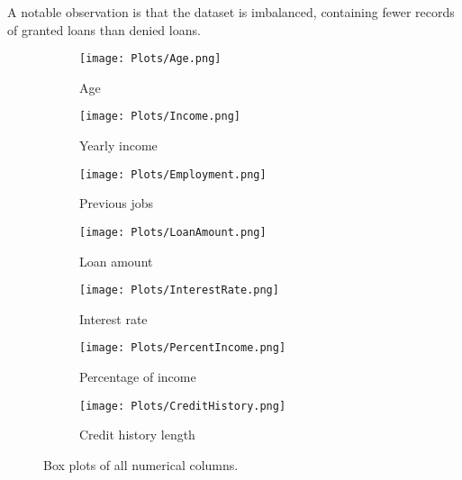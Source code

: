 A notable observation is that the dataset is imbalanced, containing fewer records of granted 
loans than denied loans.

\begin{figure}[H]
    \centering
    \begin{subfigure}[b]{0.22\textwidth}
        \centering
        \texttt{[image: Plots/Age.png]}
        \caption{Age}
        \label{fig:Boxplot1}
    \end{subfigure}
    \hfill
    \begin{subfigure}[b]{0.22\textwidth}
        \centering
        \texttt{[image: Plots/Income.png]}
        \caption{Yearly income}
        \label{fig:Boxplot2}
    \end{subfigure}
    \hfill
    \begin{subfigure}[b]{0.22\textwidth}
        \centering
        \texttt{[image: Plots/Employment.png]}
        \caption{Previous jobs}
        \label{fig:Boxplot3}
    \end{subfigure}
    \hfill
    \begin{subfigure}[b]{0.22\textwidth}
        \centering
        \texttt{[image: Plots/LoanAmount.png]}
        \caption{Loan amount}
        \label{fig:Boxplot4}
    \end{subfigure}
    
    \vspace{1em}
    
    \begin{subfigure}[b]{0.3\textwidth}
        \centering
        \texttt{[image: Plots/InterestRate.png]}
        \caption{Interest rate}
        \label{fig:Boxplot5}
    \end{subfigure}
    \hfill
    \begin{subfigure}[b]{0.3\textwidth}
        \centering
        \texttt{[image: Plots/PercentIncome.png]}
        \caption{Percentage of income}
        \label{fig:Boxplot6}
    \end{subfigure}
    \hfill
    \begin{subfigure}[b]{0.3\textwidth}
        \centering
        \texttt{[image: Plots/CreditHistory.png]}
        \caption{Credit history length}
        \label{fig:Boxplot7}
    \end{subfigure}
    
    \caption{Box plots of all numerical columns.}
    \label{fig:Boxplots}
\end{figure}

